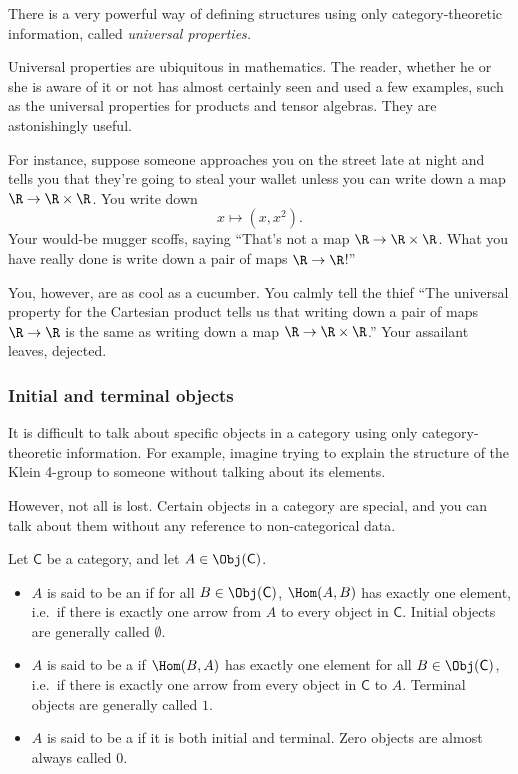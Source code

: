 \documentclass[notes.tex]{subfiles}
\begin{document}
There is a very powerful way of defining structures using only category-theoretic information, called \emph{universal properties.}

Universal properties are ubiquitous in mathematics. The reader, whether he or she is aware of it or not has almost certainly seen and used a few examples, such as the universal properties for products and tensor algebras. They are astonishingly useful.

For instance, suppose someone approaches you on the street late at night and tells you that they're going to steal your wallet unless you can write down a map $\R \to \R \times \R$. You write down
\begin{equation*}
  x \mapsto (x, x^{2}).
\end{equation*}
Your would-be mugger scoffs, saying ``That's not a map $\R \to \R \times \R$. What you have really done is write down a pair of maps $\R \to \R$!''

You, however, are as cool as a cucumber. You calmly tell the thief ``The universal property for the Cartesian product tells us that writing down a pair of maps $\R \to \R$ is the same as writing down a map $\R \to \R \times \R$.'' Your assailant leaves, dejected.


\subsubsection{Initial and terminal objects}

It is difficult to talk about specific objects in a category using only category-theoretic information. For example, imagine trying to explain the structure of the Klein 4-group to someone without talking about its elements.

However, not all is lost. Certain objects in a category are special, and you can talk about them without any reference to non-categorical data.

\begin{definition}
  \label{def:initialfinalzeroobject}
  Let $\mathsf{C}$ be a category, and let $A \in \Obj(\mathsf{C})$.
  \begin{itemize}
    \item $A$ is said to be an  if for all $B\in \Obj(\mathsf{C})$, $\Hom(A,B)$ has exactly one element, i.e.\ if there is exactly one arrow from $A$ to every object in $\mathsf{C}$. Initial objects are generally called $\emptyset$.

    \item $A$ is said to be a  if $\Hom(B,A)$ has exactly one element for all $B\in \Obj(\mathsf{C})$, i.e.\ if there is exactly one arrow from every object in $\mathsf{C}$ to $A$. Terminal objects are generally called $1$.

    \item $A$ is said to be a  if it is both initial and terminal. Zero objects are almost always called $0$.
  \end{itemize}
\end{definition}
\end{document}
